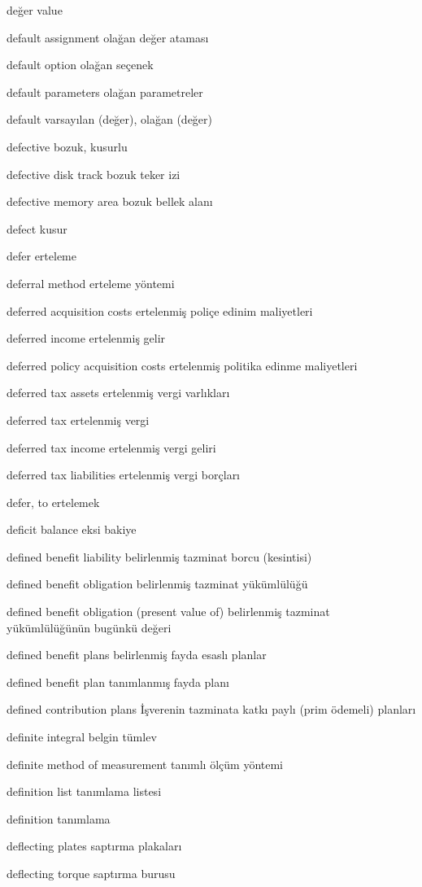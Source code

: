 \documentclass[12pt,fleqn]{article}\usepackage{../../common}
\begin{document}
değer value

default assignment olağan değer ataması

default option olağan seçenek

default parameters olağan parametreler

default varsayılan (değer), olağan (değer)

defective bozuk, kusurlu

defective disk track bozuk teker izi

defective memory area bozuk bellek alanı

defect kusur

defer erteleme

deferral method erteleme yöntemi

deferred acquisition costs ertelenmiş poliçe edinim maliyetleri

deferred income ertelenmiş gelir

deferred policy acquisition costs ertelenmiş politika edinme maliyetleri

deferred tax assets ertelenmiş vergi varlıkları

deferred tax ertelenmiş vergi

deferred tax income ertelenmiş vergi geliri

deferred tax liabilities ertelenmiş vergi borçları

defer, to ertelemek

deficit balance eksi bakiye

defined benefit liability belirlenmiş tazminat borcu (kesintisi)

defined benefit obligation belirlenmiş tazminat yükümlülüğü

defined benefit obligation (present value of) belirlenmiş tazminat yükümlülüğünün bugünkü değeri

defined benefit plans belirlenmiş fayda esaslı planlar

defined benefit plan tanımlanmış fayda planı

defined contribution plans İşverenin tazminata katkı paylı (prim ödemeli) planları

definite integral belgin tümlev

definite method of measurement tanımlı ölçüm yöntemi

definition list tanımlama listesi

definition tanımlama

deflecting plates saptırma plakaları

deflecting torque saptırma burusu
\end{document}
